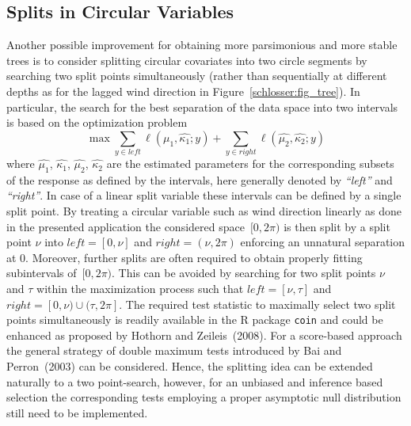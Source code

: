\documentclass[twoside]{report}
\begin{document}
\subsection{Splits in Circular Variables}
Another possible improvement for obtaining more parsimonious and more stable trees is to
consider splitting circular covariates into two circle segments by searching two split 
points simultaneously (rather than sequentially at different depths as for the lagged wind direction in Figure~\ref{schlosser:fig_tree}).
In particular, the search for the best separation of the data space into two intervals is based on the optimization problem
$$
\max \sum_{y \in \mathit{left}} \ell(\hat{\mu_1}, \hat{\kappa_1}; y) + \sum_{y \in \mathit{right}} \ell(\hat{\mu_2}, \hat{\kappa_2}; y)
$$
where $\hat{\mu_1}$, $\hat{\kappa_1}$, $\hat{\mu_2}$, $\hat{\kappa_2}$ are the estimated parameters for the corresponding subsets of the response as defined by the intervals, here generally denoted by \textit{``left''} and \textit{``right''}.
In case of a linear split variable these intervals can be defined by a single split point. 
By treating a circular variable such as wind direction linearly as done in the presented 
application the considered space~$[0,2\pi)$ is then split by a split point $\nu$ into
$\mathit{left}=[0,\nu]$ and $\mathit{right}=(\nu,2\pi)$ enforcing an unnatural separation at $0$. 
Moreover, further splits are often required to obtain properly fitting subintervals of~$[0,2\pi)$.
This can be avoided by searching for two split points $\nu$ and $\tau$ within the maximization
process such that $\mathit{left}=[\nu,\tau]$ and $\mathit{right}=[0,\nu) \cup (\tau,2\pi]$.
The required test statistic to maximally select two split points simultaneously is readily 
available in the \textsf{R} package \texttt{coin} and could be enhanced as proposed by Hothorn 
and Zeileis~(2008). For a score-based approach the general strategy of double maximum tests 
introduced by Bai and Perron~(2003) can be considered. 
Hence, the splitting idea can be extended naturally to a two point-search, however, for 
an unbiased and inference based selection the corresponding tests employing a proper
asymptotic null distribution still need to be implemented.


\bigskip


\bigskip
\end{document}
